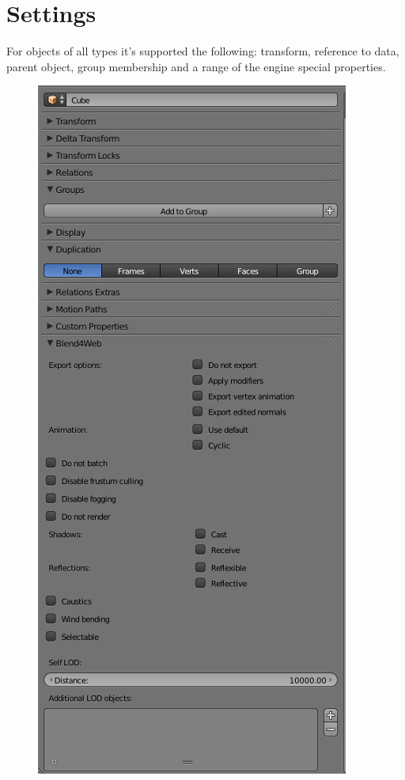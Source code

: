 \documentclass[a4paper,12pt,oneside]{sphinxmanual}
\begin{document}
\section{Settings}
\label{objects:id3}
For objects of all types it's supported the following: transform, reference to data, parent object, group membership and a range of the engine special properties.
\begin{figure}[htbp]
\centering

\includegraphics[width=0.600\linewidth]{object_setup.jpg}
\end{figure}
\end{document}
